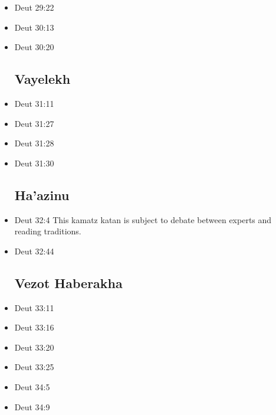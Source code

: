 \documentclass[14pt]{book}
\begin{document}
\begin{multicols}{2}
\begin{itemize}
\item Deut 29:22

\item Deut 30:13

\item Deut 30:20

\subsection{Vayelekh}

\item Deut 31:11

\item Deut 31:27

\item Deut 31:28

\item Deut 31:30

\subsection{Ha'azinu}

\item Deut 32:4 This kamatz katan is subject to debate between experts and reading traditions.

\item Deut 32:44

\subsection{Vezot Haberakha}

\item Deut 33:11

\item Deut 33:16

\item Deut 33:20

\item Deut 33:25

\item Deut 34:5

\item Deut 34:9

\end{itemize}
\end{multicols}
\end{document}
